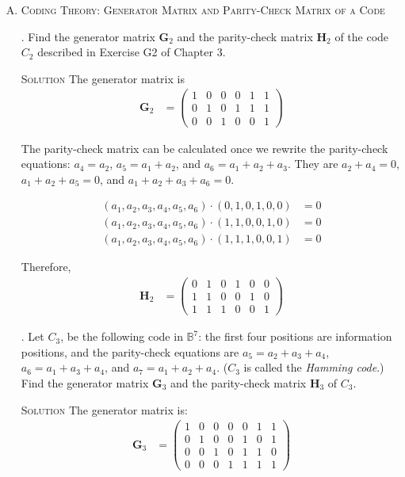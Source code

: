 \documentclass[twoside]{amsart}
\newcommand{\solution}{\textsc{Solution}\xspace}
\begin{document}
\begin{enumerate}[A.]
   \vspace{10pt}
   \item\textsc{Coding Theory: Generator Matrix and Parity-Check Matrix
   of a Code}

   . Find the generator matrix $\mathbf{G}_2$ and the
   parity-check matrix $\mathbf{H}_2$ of the code $C_2$ described
   in Exercise G2 of Chapter 3.

   \noindent \solution The generator matrix is
   \begin{align*}
       \mathbf{G}_2 & = \begin{pmatrix}
                          1 & 0 & 0 & 0 & 1 & 1 \\
			  0 & 1 & 0 & 1 & 1 & 1 \\
			  0 & 0 & 1 & 0 & 0 & 1
                        \end{pmatrix}
   \end{align*}

   \noindent The parity-check matrix can be calculated once
   we rewrite the parity-check equations: $a_4=a_2$, $a_5=a_1+a_2$,
   and $a_6=a_1+a_2+a_3$. They are $a_2+a_4=0$, $a_1+a_2+a_5=0$,
   and $a_1+a_2+a_3+a_6=0$.

   \begin{align*}
       (a_1,a_2,a_3,a_4,a_5,a_6)\cdot(0,1,0,1,0,0) &= 0 \\
       (a_1,a_2,a_3,a_4,a_5,a_6)\cdot(1,1,0,0,1,0) &= 0 \\
       (a_1,a_2,a_3,a_4,a_5,a_6)\cdot(1,1,1,0,0,1) &= 0
   \end{align*}

   Therefore,
   \begin{align*}
       \mathbf{H}_2 & =
          \begin{pmatrix}
	    0 & 1 & 0 & 1 & 0 & 0 \\
	    1 & 1 & 0 & 0 & 1 & 0 \\
	    1 & 1 & 1 & 0 & 0 & 1
	  \end{pmatrix}
   \end{align*}

   . Let $C_3$, be the following code in $\mathbb{B}^7$: the first
   four positions are information positions, and the parity-check equations
   are $a_5=a_2+a_3+a_4$, $a_6=a_1+a_3+a_4$, and $a_7=a_1+a_2+a_4$.
   ($C_3$ is called the \emph{Hamming code}.) Find the generator matrix
   $\mathbf{G}_3$ and the parity-check matrix $\mathbf{H}_3$ of $C_3$.

   \noindent \solution The generator matrix is:
   \begin{align*}
      \mathbf{G}_3 & = 
         \begin{pmatrix}
	    1 & 0 & 0 & 0 & 0 & 1 & 1 \\
	    0 & 1 & 0 & 0 & 1 & 0 & 1 \\
	    0 & 0 & 1 & 0 & 1 & 1 & 0 \\
	    0 & 0 & 0 & 1 & 1 & 1 & 1
	 \end{pmatrix}
   \end{align*}


\end{enumerate}
\end{document}
